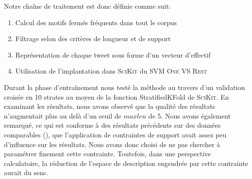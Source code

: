  Notre chaîne de traitement est donc définie comme suit:
\begin{enumerate}
  \item Calcul des motifs fermés fréquents dans tout le corpus
  \item Filtrage selon des critères de longueur et de support
  \item Représentation de chaque tweet sous forme d'un vecteur d'effectif
  \item Utilisation de l'implantation dans \textsc{SciKit} du SVM \textsc{One VS Rest}
\end{enumerate}

 
Durant la phase d'entraînement nous testé la méthode au travers d'un validation croisée en 10 strates au moyen de la fonction StratifiedKFold de \textsc{SciKit}. En examinant les résultats, nous avons observé que la qualité des résultats n'augmentait plus au delà d'un seuil de $maxlen$ de 5.
Nous avons également remarqué, ce qui est conforme à des résultats précédents sur des données comparables (\cite{Buscaldi-2017}), que l'application de contraintes de support avait assez peu d'influence sur les résultats. Nous avons donc choisi de ne pas chercher à paramétrer finement cette contrainte. Toutefois, dans une perspective calculatoire, la réduction de l'espace de description engendrée par cette contrainte aurait du sens.
 

